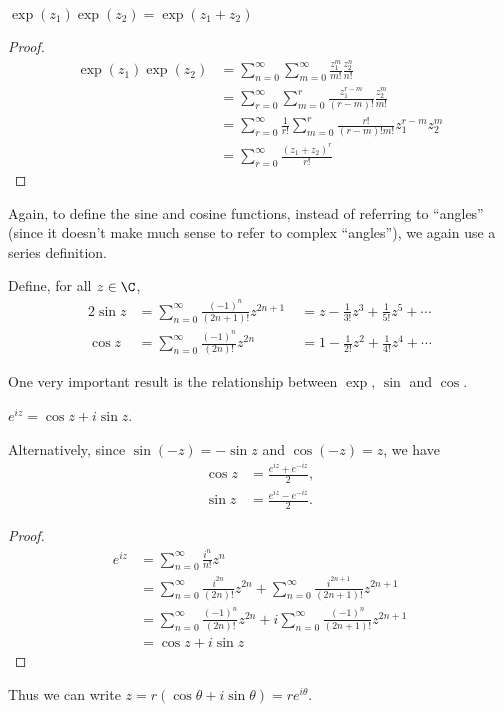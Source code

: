 \documentclass[a4paper]{article}
\begin{document}
\begin{thm}
  $\exp(z_1)\exp(z_2) = \exp(z_1 + z_2)$
\end{thm}

\begin{proof}
  \begin{align*}
    \exp(z_1)\exp(z_2) &= \sum_{n = 0}^\infty\sum_{m = 0}^\infty \frac{z_1^m}{m!}\frac{z_2^n}{n!}\\
    &= \sum_{r = 0}^\infty\sum_{m = 0}^r \frac{z_1^{r - m}}{(r - m)!}\frac{z_2^m}{m!}\\
    &= \sum_{r = 0}^\infty\frac{1}{r!}\sum_{m = 0}^r \frac{r!}{(r - m)!m!}z_1^{r - m}z_2^m\\
    &= \sum_{r = 0}^\infty\frac{(z_1 + z_2)^r}{r!}
  \end{align*}
\end{proof}

Again, to define the sine and cosine functions, instead of referring to ``angles'' (since it doesn't make much sense to refer to complex ``angles''), we again use a series definition.
\begin{defi}
  Define, for all $z\in \C$,
  \begin{alignat*}{2}
    \sin z &= \sum_{n=0}^\infty \frac{(-1)^n}{(2n+1)!}z^{2n+1} &\;= z - \frac{1}{3!}z^3 + \frac{1}{5!}z^5 + \cdots\\
    \cos z &= \sum_{n=0}^\infty \frac{(-1)^n}{(2n)!}z^{2n} &\;= 1 - \frac{1}{2!}z^2 + \frac{1}{4!}z^4 + \cdots
  \end{alignat*}
\end{defi}

One very important result is the relationship between $\exp$, $\sin$ and $\cos$.
\begin{thm}
  $e^{iz} = \cos z + i\sin z$.
\end{thm}
Alternatively, since $\sin (-z) = -\sin z$ and $\cos(-z) = z$, we have
\begin{align*}
  \cos z &= \frac{e^{iz} + e^{-iz}}{2},\\
  \sin z &= \frac{e^{iz} - e^{-iz}}{2}.
\end{align*}

\begin{proof}
  \begin{align*}
    e^{iz} &= \sum_{n=0}^\infty \frac{i^n}{n!}z^n\\
    &= \sum_{n=0}^\infty \frac{i^{2n}}{(2n)!}z^{2n} + \sum_{n=0}^\infty \frac{i^{2n+1}}{(2n+1)!}z^{2n+1}\\
    &= \sum_{n=0}^\infty \frac{(-1)^n}{(2n)!}z^{2n} + i \sum_{n=0}^\infty \frac{(-1)^n}{(2n+1)!}z^{2n+1}\\
    &= \cos z + i\sin z
  \end{align*}
\end{proof}
Thus we can write $z = r(\cos\theta + i\sin\theta) = re^{i\theta}$.
\end{document}

